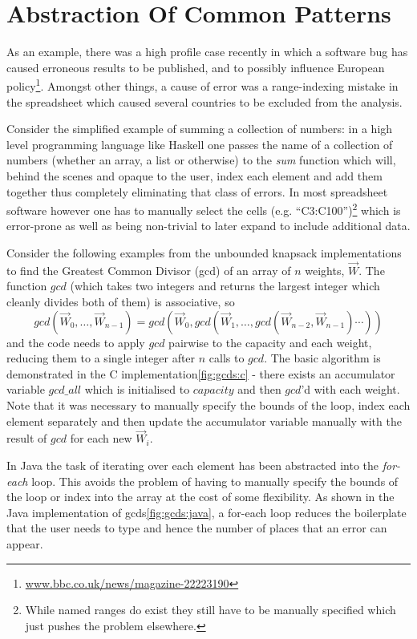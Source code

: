 \section{Abstraction Of Common Patterns}
As an example, there was a high profile case recently\cite{Herndon13} in which a
software bug has caused erroneous results to be published, and to possibly influence European policy\footnote{\url{www.bbc.co.uk/news/magazine-22223190}}. Amongst other things, a cause of error was a range-indexing mistake in the spreadsheet which caused several countries to be excluded from the analysis.

Consider the simplified example of summing a collection of numbers: in a high level programming language like Haskell one passes the name of a collection of numbers (whether an array, a list or otherwise) to the \emph{sum} function which will, behind the scenes and opaque to the user, index each element and add them together thus completely eliminating that class of errors. In most spreadsheet software however one has to manually select the cells (e.g. ``C3:C100'')\footnote{While named ranges do exist they still have to be manually specified which just pushes the problem elsewhere.} which is error-prone as well as being non-trivial to later expand to include additional data.

Consider the following examples from the unbounded knapsack implementations to find the Greatest Common Divisor (gcd) of an array of $n$ weights, $\vec{W}$. The function $gcd$ (which takes two integers and returns the largest integer which cleanly divides both of them) is associative, so $$ gcd (\vec{W}_0, \ldots, \vec{W}_{n-1}) =  gcd(\vec{W}_0,gcd(\vec{W}_1, \ldots,gcd (\vec{W}_{n-2},\vec{W}_{n-1})\cdots)) $$ and the code needs to apply $gcd$ pairwise to the capacity and each weight, reducing them to a single integer after $n$ calls to $gcd$. The basic algorithm is demonstrated in the C implementation\ref{fig:gcds:c} - there exists an accumulator variable $gcd\_all$ which is initialised to $capacity$ and then $gcd$'d with each weight. Note that it was necessary to manually specify the bounds of the loop, index each element separately and then update the accumulator variable manually with the result of $gcd$ for each new $\vec{W}_i$.

In Java the task of iterating over each element has been abstracted into the \emph{for-each} loop. This avoids the problem of having to manually specify the bounds of the loop or index into the array at the cost of some flexibility. As shown in the Java implementation of gcds\ref{fig:gcds:java}, a for-each loop reduces the boilerplate that the user needs to type and hence the number of places that an error can appear.

